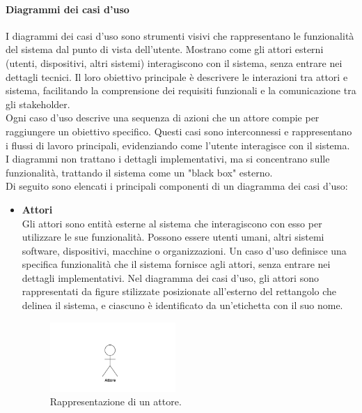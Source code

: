 \documentclass[10pt]{article}
\begin{document}
\begin{justify}
        \paragraph{Diagrammi dei casi d'uso}
        I diagrammi dei casi d'uso sono strumenti visivi che rappresentano le funzionalità del sistema dal punto di vista dell'utente. Mostrano come gli attori esterni (utenti, dispositivi, altri sistemi) interagiscono con il sistema, senza entrare nei dettagli tecnici. Il loro obiettivo principale è descrivere le interazioni tra attori e sistema, facilitando la comprensione dei requisiti funzionali e la comunicazione tra gli stakeholder.\\
        Ogni caso d'uso descrive una sequenza di azioni che un attore compie per raggiungere un obiettivo specifico. Questi casi sono interconnessi e rappresentano i flussi di lavoro principali, evidenziando come l'utente interagisce con il sistema. I diagrammi non trattano i dettagli implementativi, ma si concentrano sulle funzionalità, trattando il sistema come un "black box" esterno.\\
        Di seguito sono elencati i principali componenti di un diagramma dei casi d’uso:
        \begin{itemize}
            \item \textbf{Attori}\\
            Gli attori sono entità esterne al sistema che interagiscono con esso per utilizzare le sue funzionalità. Possono essere utenti umani, altri sistemi software, dispositivi, macchine o organizzazioni. Un caso d'uso definisce una specifica funzionalità che il sistema fornisce agli attori, senza entrare nei dettagli implementativi. Nel diagramma dei casi d'uso, gli attori sono rappresentati da figure stilizzate posizionate all'esterno del rettangolo che delinea il sistema, e ciascuno è identificato da un’etichetta con il suo nome.
            \begin{figure}[H]
            \centering
            \includegraphics[width=0.45\textwidth]{Attore.PNG}
            \caption{Rappresentazione di un attore.}
            \end{figure}


\end{itemize}
\end{justify}
\end{document}
